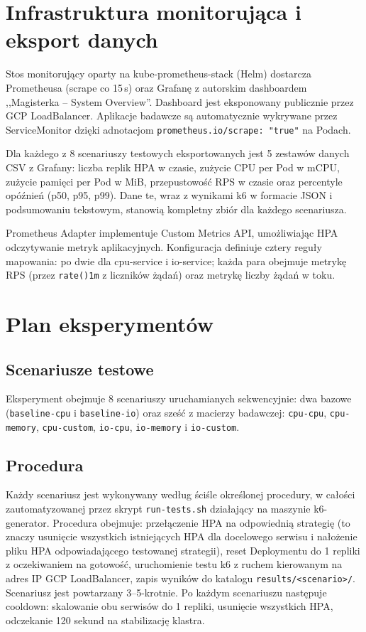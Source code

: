 \section{Infrastruktura monitorująca i eksport danych}

Stos monitorujący oparty na kube-prometheus-stack (Helm) dostarcza Prometheusa (scrape co 15\,s) oraz Grafanę z autorskim dashboardem ,,Magisterka -- System Overview''. Dashboard jest eksponowany publicznie przez GCP LoadBalancer. Aplikacje badawcze są automatycznie wykrywane przez ServiceMonitor dzięki adnotacjom \texttt{prometheus.io/scrape: "true"} na Podach.

Dla każdego z 8 scenariuszy testowych eksportowanych jest 5 zestawów danych CSV z Grafany: liczba replik HPA w czasie, zużycie CPU per Pod w mCPU, zużycie pamięci per Pod w MiB, przepustowość RPS w czasie oraz percentyle opóźnień (p50, p95, p99). Dane te, wraz z wynikami k6 w formacie JSON i podsumowaniu tekstowym, stanowią kompletny zbiór dla każdego scenariusza.

Prometheus Adapter implementuje Custom Metrics API, umożliwiając HPA odczytywanie metryk aplikacyjnych. Konfiguracja definiuje cztery reguły mapowania: po dwie dla cpu-service i io-service; każda para obejmuje metrykę RPS (przez \texttt{rate()\lbrack{}1m\rbrack{}} z liczników żądań) oraz metrykę liczby żądań w toku.

\section{Plan eksperymentów}

\subsection{Scenariusze testowe}

Eksperyment obejmuje 8 scenariuszy uruchamianych sekwencyjnie: dwa bazowe (\texttt{baseline-cpu} i \texttt{baseline-io}) oraz sześć z macierzy badawczej: \texttt{cpu-cpu}, \texttt{cpu-memory}, \texttt{cpu-custom}, \texttt{io-cpu}, \texttt{io-memory} i \texttt{io-custom}.

\subsection{Procedura}

Każdy scenariusz jest wykonywany według ściśle określonej procedury, w całości zautomatyzowanej przez skrypt \texttt{run-tests.sh} działający na maszynie k6-generator. Procedura obejmuje: przełączenie HPA na odpowiednią strategię (to znaczy usunięcie wszystkich istniejących HPA dla docelowego serwisu i nałożenie pliku HPA odpowiadającego testowanej strategii), reset Deploymentu do 1 repliki z oczekiwaniem na gotowość, uruchomienie testu k6 z ruchem kierowanym na adres IP GCP LoadBalancer, zapis wyników do katalogu \texttt{results/<scenario>/}. Scenariusz jest powtarzany 3--5-krotnie. Po każdym scenariuszu następuje cooldown: skalowanie obu serwisów do 1 repliki, usunięcie wszystkich HPA, odczekanie 120 sekund na stabilizację klastra.

